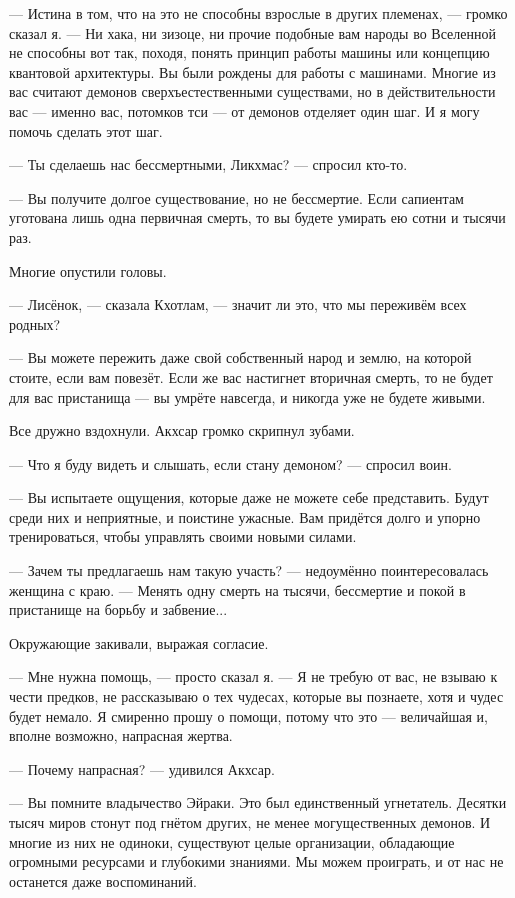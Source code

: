 --- Истина в том, что на это не способны взрослые в других племенах, --- громко сказал я.
--- Ни хака, ни зизоце, ни прочие подобные вам народы во Вселенной не способны вот так, походя, понять принцип работы машины или концепцию квантовой архитектуры.
Вы были рождены для работы с машинами.
Многие из вас считают демонов сверхъестественными существами, но в действительности вас --- именно вас, потомков тси --- от демонов отделяет один шаг.
И я могу помочь сделать этот шаг.

--- Ты сделаешь нас бессмертными, Ликхмас? --- спросил кто-то.

--- Вы получите долгое существование, но не бессмертие.
Если сапиентам уготована лишь одна первичная смерть, то вы будете умирать ею сотни и тысячи раз.

Многие опустили головы.

--- Лисёнок, --- сказала Кхотлам, --- значит ли это, что мы переживём всех родных?

--- Вы можете пережить даже свой собственный народ и землю, на которой стоите, если вам повезёт.
Если же вас настигнет вторичная смерть, то не будет для вас пристанища --- вы умрёте навсегда, и никогда уже не будете живыми.

Все дружно вздохнули.
Акхсар громко скрипнул зубами.

--- Что я буду видеть и слышать, если стану демоном? --- спросил воин.

--- Вы испытаете ощущения, которые даже не можете себе представить.
Будут среди них и неприятные, и поистине ужасные.
Вам придётся долго и упорно тренироваться, чтобы управлять своими новыми силами.

--- Зачем ты предлагаешь нам такую участь? --- недоумённо поинтересовалась женщина с краю.
--- Менять одну смерть на тысячи, бессмертие и покой в пристанище на борьбу и забвение...

Окружающие закивали, выражая согласие.

--- Мне нужна помощь, --- просто сказал я.
--- Я не требую от вас, не взываю к чести предков, не рассказываю о тех чудесах, которые вы познаете, хотя и чудес будет немало.
Я смиренно прошу о помощи, потому что это --- величайшая и, вполне возможно, напрасная жертва.

--- Почему напрасная? --- удивился Акхсар.

--- Вы помните владычество Эйраки.
Это был единственный угнетатель.
Десятки тысяч миров стонут под гнётом других, не менее могущественных демонов.
И многие из них не одиноки, существуют целые организации, обладающие огромными ресурсами и глубокими знаниями.
Мы можем проиграть, и от нас не останется даже воспоминаний.

